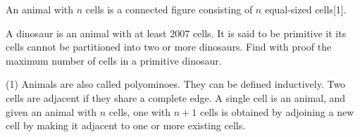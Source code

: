 An animal with $n$ cells is a connected figure consisting of $n$ equal-sized cells[1].

A dinosaur is an animal with at least $2007$ cells. It is said to be primitive it its cells cannot be partitioned into two or more dinosaurs. Find with proof the maximum number of cells in a primitive dinosaur.

(1) Animals are also called polyominoes. They can be defined inductively. Two cells are adjacent if they share a complete edge. A single cell is an animal, and given an animal with $n$ cells, one with $n+1$ cells is obtained by adjoining a new cell by making it adjacent to one or more existing cells.